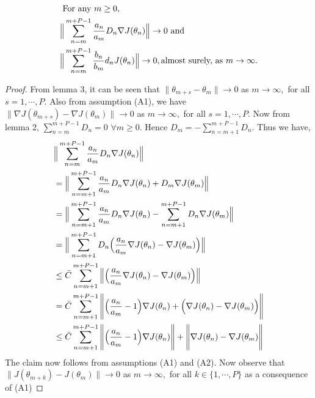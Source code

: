 \begin{lemma}
\begin{align*}
&\text{ For any } m \geq0,\\
&\Big{\|}\sum_{n=m}^{m+P-1}\frac{a_n}{a_m}D_n\nabla J(\theta_n)\Big{\|}\rightarrow 0 \text{ and }\\
&\Big{\|}\sum_{n=m}^{m+P-1}\frac{b_n}{b_m}d_nJ(\theta_n)\Big{\|}\rightarrow 0,
\text{almost surely, as } m \rightarrow \infty.
\end{align*}
\end{lemma}
\begin{proof}
 From lemma 3, it can be seen that
  $\|\theta_{m+s}-\theta_{m}\|\rightarrow 0$ as $m\rightarrow \infty,$
 for all $s=1,\cdots,P.$ Also from assumption (A1), we have
 $\|\nabla J(\theta_{m+s})-\nabla J(\theta_{m})\|\rightarrow 0$ as $m\rightarrow \infty,$
 for all $s=1,\cdots,P.$ Now from lemma 2, $\sum\limits_{n=m}^{m+P-1}D_n=0$ $\forall m\geq0.$
 Hence $D_m=-\sum\limits_{n=m+1}^{m+P-1}D_n.$ Thus we have, 
 \begin{align*}
  &\Big{\|}\sum_{n=m}^{m+P-1}\frac{a_n}{a_m}D_n\nabla J(\theta_n)\Big{\|}\\
  & = \Big{\|}\sum_{n=m+1}^{m+P-1}\frac{a_n}{a_m}D_n\nabla J(\theta_n)
  +D_{m}\nabla J(\theta_{m})\Big{\|}\\
  &=\Big{\|}\sum_{n=m+1}^{m+P-1}\frac{a_n}{a_m}D_n \nabla J(\theta_n)
     -\sum_{n=m+1}^{m+P-1}D_n\nabla J(\theta_{m})\Big{\|}\\
  &=\Big{\|}\sum_{n=m+1}^{m+P-1}D_n\Big{(}\frac{a_n}{a_m}\nabla J(\theta_n)
  -\nabla J(\theta_{m})\Big{)}\Big{\|}\\
  &\leq \bar{C}\sum_{n=m+1}^{m+P-1}\Big{\|}\Big{(}\frac{a_n}{a_m}\nabla J(\theta_n)
  -\nabla J(\theta_{m})\Big{)}\Big{\|}\\
  &=\bar{C}\sum_{n=m+1}^{m+P-1}\Bigg{\|}\Big{(}\frac{a_n}{a_m}-1\Big{)}\nabla J(\theta_n)
   +\Big{(}\nabla J(\theta_n)-\nabla J(\theta_{m})\Big{)}\Bigg{\|}\\
  &\leq \bar{C}\sum_{n=m+1}^{m+P-1}\Bigg{\|}\Big{(}\frac{a_n}{a_m}-1\Big{)}\nabla J(\theta_n)\Bigg{\|}
  +\Bigg{\|}\nabla J(\theta_n)-\nabla J(\theta_{m})\Bigg{\|}
 \end{align*}
 The claim now follows from assumptions (A1) and (A2).
 Now observe that $\|J(\theta_{m+k})-J(\theta_{m})\|\rightarrow 0$ as $m\rightarrow \infty,$
 for all $k \in \{1,\cdots,P\}$ as a consequence of (A1)

\end{proof}
